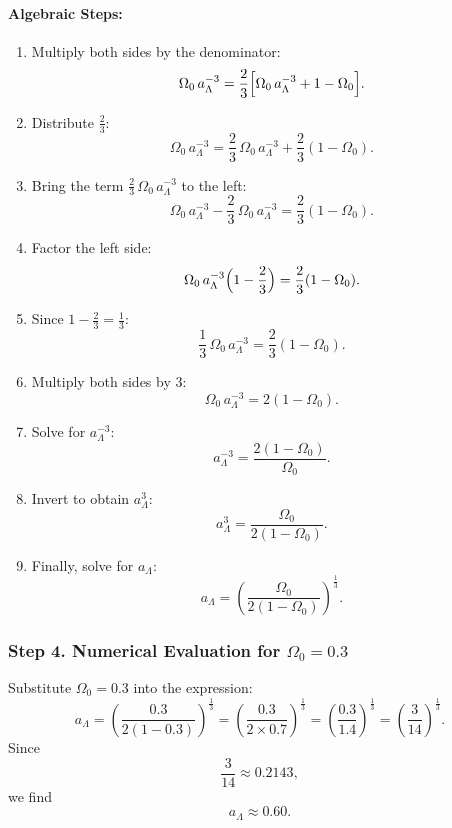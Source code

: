 \documentclass{article}
\begin{document}
\paragraph{Algebraic Steps:}
\begin{enumerate}
    \item Multiply both sides by the denominator:
    \[
    \Omega_0\,a_\Lambda^{-3} = \frac{2}{3}\Bigl[\Omega_0\,a_\Lambda^{-3} + 1 - \Omega_0\Bigr].
    \]
    \item Distribute \(\frac{2}{3}\):
    \[
    \Omega_0\,a_\Lambda^{-3} = \frac{2}{3}\,\Omega_0\,a_\Lambda^{-3} + \frac{2}{3}(1-\Omega_0).
    \]
    \item Bring the term \(\frac{2}{3}\,\Omega_0\,a_\Lambda^{-3}\) to the left:
    \[
    \Omega_0\,a_\Lambda^{-3} - \frac{2}{3}\,\Omega_0\,a_\Lambda^{-3} = \frac{2}{3}(1-\Omega_0).
    \]
    \item Factor the left side:
    \[
    \Omega_0\,a_\Lambda^{-3}\Bigl(1-\frac{2}{3}\Bigr) = \frac{2}{3}(1-\Omega_0).
    \]
    \item Since \(1-\frac{2}{3} = \frac{1}{3}\):
    \[
    \frac{1}{3}\,\Omega_0\,a_\Lambda^{-3} = \frac{2}{3}(1-\Omega_0).
    \]
    \item Multiply both sides by \(3\):
    \[
    \Omega_0\,a_\Lambda^{-3} = 2(1-\Omega_0).
    \]
    \item Solve for \(a_\Lambda^{-3}\):
    \[
    a_\Lambda^{-3} = \frac{2(1-\Omega_0)}{\Omega_0}.
    \]
    \item Invert to obtain \(a_\Lambda^3\):
    \[
    a_\Lambda^3 = \frac{\Omega_0}{2(1-\Omega_0)}.
    \]
    \item Finally, solve for \(a_\Lambda\):
    \[
    \boxed{a_\Lambda = \left(\frac{\Omega_0}{2(1-\Omega_0)}\right)^{\frac{1}{3}}.}
    \]
\end{enumerate}

\subsubsection*{Step 4. Numerical Evaluation for \(\Omega_0 = 0.3\)}

Substitute \(\Omega_0 = 0.3\) into the expression:
\[
a_\Lambda = \left(\frac{0.3}{2(1-0.3)}\right)^{\frac{1}{3}}
= \left(\frac{0.3}{2 \times 0.7}\right)^{\frac{1}{3}}
= \left(\frac{0.3}{1.4}\right)^{\frac{1}{3}}
= \left(\frac{3}{14}\right)^{\frac{1}{3}}.
\]
Since
\[
\frac{3}{14} \approx 0.2143,
\]
we find
\[
a_\Lambda \approx 0.60.
\]

\bigskip
\end{document}
